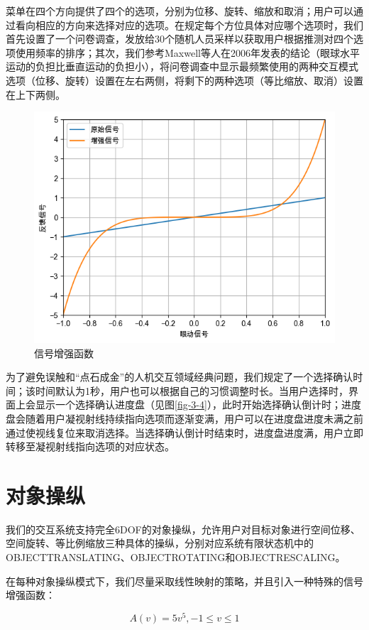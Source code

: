 菜单在四个方向提供了四个的选项，分别为位移、旋转、缩放和取消；用户可以通过看向相应的方向来选择对应的选项。在规定每个方位具体对应哪个选项时，我们首先设置了一个问卷调查，发放给30个随机人员采样以获取用户根据推测对四个选项使用频率的排序；其次，我们参考Maxwell等人在2006年发表的结论（眼球水平运动的负担比垂直运动的负担小），将问卷调查中显示最频繁使用的两种交互模式选项（位移、旋转）设置在左右两侧，将剩下的两种选项（等比缩放、取消）设置在上下两侧。

\begin{figure}[b!]
    \centering
    \includegraphics[width=.7\textwidth]{figure/augmented.png}
    \caption{信号增强函数}
    \label{fig-3-2}
\end{figure}

为了避免误触和“点石成金”的人机交互领域经典问题，我们规定了一个选择确认时间；该时间默认为1秒，用户也可以根据自己的习惯调整时长。当用户选择时，界面上会显示一个选择确认进度盘（见图\ref{fig-3-4}），此时开始选择确认倒计时；进度盘会随着用户凝视射线持续指向选项而逐渐变满，用户可以在进度盘进度未满之前通过使视线复位来取消选择。当选择确认倒计时结束时，进度盘进度满，用户立即转移至凝视射线指向选项的对应状态。

\section{对象操纵}
\label{Manipulation}

我们的交互系统支持完全6DOF的对象操纵，允许用户对目标对象进行空间位移、空间旋转、等比例缩放三种具体的操纵，分别对应系统有限状态机中的OBJECT\us TRANSLATING、OBJECT\us ROTATING和OBJECT\us RESCALING。

在每种对象操纵模式下，我们尽量采取线性映射的策略，并且引入一种特殊的信号增强函数：

\begin{equation}
	\label{formula-3-1}
	A(v) = 5v^{5}, -1 \le v \le 1
\end{equation}

